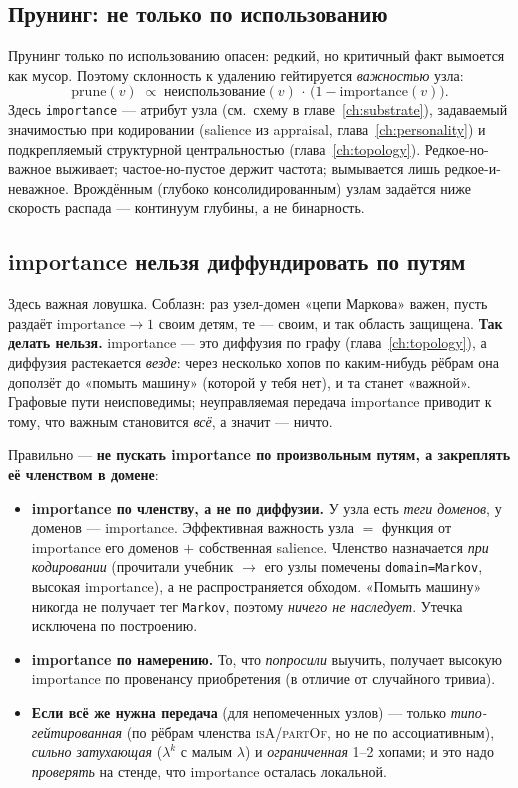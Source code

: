 \subsection{Прунинг: не только по использованию}

Прунинг только по использованию опасен: редкий, но критичный факт вымоется как
мусор. Поэтому склонность к удалению гейтируется \emph{важностью} узла:
\begin{equation}
\text{prune}(v)\;\propto\;\text{неиспользование}(v)\,\cdot\,\big(1-\text{importance}(v)\big).
\end{equation}
Здесь \texttt{importance} — атрибут узла (см.\ схему в главе~\ref{ch:substrate}),
задаваемый значимостью при кодировании (salience из appraisal,
глава~\ref{ch:personality}) и подкрепляемый структурной центральностью
(глава~\ref{ch:topology}). Редкое-но-важное выживает; частое-но-пустое держит
частота; вымывается лишь редкое-и-неважное. Врождённым (глубоко консолидированным)
узлам задаётся ниже скорость распада — континуум глубины, а не бинарность.

\subsection{importance нельзя диффундировать по путям}
\label{sec:importance-leak}

Здесь важная ловушка. Соблазн: раз узел-домен «цепи Маркова» важен, пусть раздаёт
$\text{importance}\to 1$ своим детям, те — своим, и так область защищена. \textbf{Так
делать нельзя.} importance — это диффузия по графу (глава~\ref{ch:topology}), а
диффузия растекается \emph{везде}: через несколько хопов по каким-нибудь рёбрам она
доползёт до «помыть машину» (которой у тебя нет), и та станет «важной». Графовые пути
неисповедимы; неуправляемая передача importance приводит к тому, что важным
становится \emph{всё}, а значит — ничто.

Правильно — \textbf{не пускать importance по произвольным путям, а закреплять её
членством в домене}:

\begin{itemize}\itemsep2pt
\item \textbf{importance по членству, а не по диффузии.} У узла есть \emph{теги
доменов}, у доменов — importance. Эффективная важность узла $=$ функция от
importance его доменов $+$ собственная salience. Членство назначается \emph{при
кодировании} (прочитали учебник $\to$ его узлы помечены \texttt{domain=Markov},
высокая importance), а не распространяется обходом. «Помыть машину» никогда не
получает тег \texttt{Markov}, поэтому \emph{ничего не наследует}. Утечка исключена по
построению.
\item \textbf{importance по намерению.} То, что \emph{попросили} выучить, получает
высокую importance по провенансу приобретения (в отличие от случайного тривиа).
\item \textbf{Если всё же нужна передача} (для непомеченных узлов) — только
\emph{типо-гейтированная} (по рёбрам членства \textsc{isA}/\textsc{partOf}, но не по
ассоциативным), \emph{сильно затухающая} ($\lambda^k$ с малым $\lambda$) и
\emph{ограниченная} 1--2 хопами; и это надо \emph{проверять} на стенде, что importance
осталась локальной.
\end{itemize}

